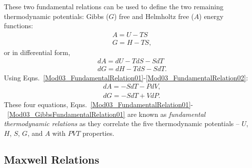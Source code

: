 \documentclass[12pts,a4paper,amsmath,amssymb,floatfix]{article}%
\begin{document}
These two fundamental relations can be used to define the two remaining thermodynamic potentials: Gibbs ($G$) free and Helmholtz free ($A$) energy functions:
   \begin{eqnarray}
      && A = U -TS \nonumber \\
      && G =  H -TS, \nonumber 
   \end{eqnarray}
or in differential form,
   \begin{eqnarray}
      && dA = dU -TdS - SdT \nonumber \\
      && dG = dH -TdS - SdT.\nonumber 
   \end{eqnarray}
Using Eqns.~\ref{Mod03_FundamentalRelation01}-\ref{Mod03_FundamentalRelation02}:
   \begin{eqnarray}
      && dA = - SdT - PdV, \label{Mod03_HelmholtzFundamentalRelation01}\\ 
      && dG = - SdT + VdP. \label{Mod03_GibbsFundamentalRelation01}
   \end{eqnarray}
These four equations, Eqns.~\ref{Mod03_FundamentalRelation01}-~\ref{Mod03_GibbsFundamentalRelation01} are known as {\it fundamental thermodynamic relations} as they correlate the five thermodynamic potentials -- $U$, $H$, $S$, $G$, and $A$ with $PVT$ properties.



\subsection{Maxwell Relations}\label{Section:03:MaxwellRelations}
\end{document}
